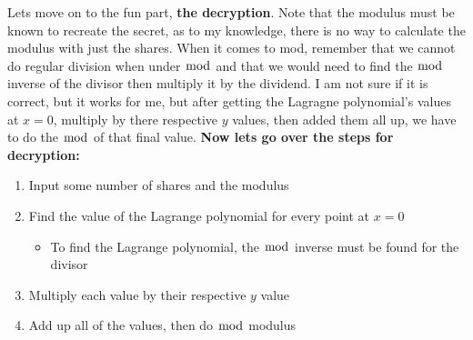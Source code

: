 \documentclass[15pt]{article}
\begin{document}
\begin{flushleft}
Lets move on to the fun part, \textbf{the decryption}. Note that the modulus
must be known to recreate the secret, as to my knowledge, there is no way to
calculate the modulus with just the shares. When it comes to mod, remember that
we cannot do regular division when under $\bmod$ and that we would need to find
the $\bmod$ inverse of the divisor then multiply it by the dividend. I am not
sure if it is correct, but it works for me, but after getting the Lagragne
polynomial's values at $x=0$, multiply by there respective $y$ values, then
added them all up, we have to do the $\bmod$ of that final value.
\textbf{Now lets go over the steps for decryption:}
\begin{enumerate}
    \item Input some number of shares and the modulus
    \item Find the value of the Lagrange polynomial for every point at $x=0$
        \begin{itemize}
            \item To find the Lagrange polynomial, the $\bmod$ inverse must be
                    found for the divisor
        \end{itemize}
    \item Multiply each value by their respective $y$ value
    \item Add up all of the values, then do $\bmod$ modulus
\end{enumerate}


\end{flushleft}
\end{document}
